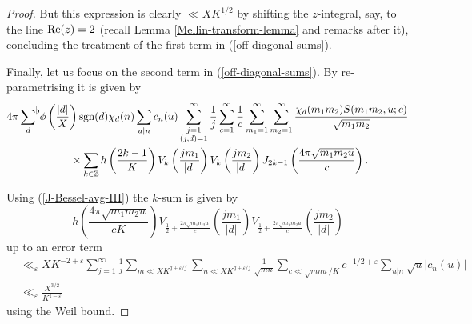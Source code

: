 \documentclass[a4paper,10pt,twoside]{amsart}
\theoremstyle{definition}
\numberwithin{equation}{section}
\newcommand\Z{\mathbb{Z}}
\newcommand\eps{\varepsilon}
\renewcommand{\Re}{\textnormal{Re}}
\renewcommand\:{\colon}
\newcommand{\sumflat}{\mathop{{\sum}^{\raisebox{-3pt}{\makebox[0pt][l]{$\flat$}}}}}
\begin{document}
\begin{proof}

\noindent But this expression is clearly $\ll XK^{1/2}$ by shifting the $z$-integral, say, to the line $\Re(z)=2$ (recall Lemma \ref{Mellin-transform-lemma} and remarks after it), concluding the treatment of the first term in (\ref{off-diagonal-sums}). 

Finally, let us focus on the second term in (\ref{off-diagonal-sums}). By re-parametrising it is given by 
\begin{align*}
&4\pi \sumflat_d\,\phi\left(\frac{|d|}X\right)\text{sgn}(d)\chi_d(n)\sum_{u|n}c_n(u)\sum_{\substack{j=1\\(j,d)=1}}^\infty\frac1j\sum_{c=1}^\infty\frac1c\sum_{m_1=1}^\infty\sum_{m_2=1}^\infty\frac{\chi_d(m_1m_2)S(m_1m_2,u;c)}{\sqrt{m_1m_2}}\\
&\qquad\qquad\qquad\times\sum_{k\in\Z}h\left(\frac{2k-1}K\right)V_k\left(\frac{jm_1}{|d|}\right)V_k\left(\frac{jm_2}{|d|}\right)J_{2k-1}\left(\frac{4\pi\sqrt{m_1m_2u}}{c}\right).
\end{align*}

Using (\ref{J-Bessel-avg-III}) the $k$-sum is given by
\[
h\left(\frac{4\pi\sqrt{m_1m_2u}}{cK}\right)V_{\frac12+\frac{2\pi\sqrt{m_1m_2u}}{c}}\left(\frac{jm_1}{|d|}\right)V_{\frac12+\frac{2\pi\sqrt{m_1m_2u}}{c}}\left(\frac{jm_2}{|d|}\right)
\]
up to an error term 
\begin{align*}
&\ll_\eps XK^{-2+\eps}\sum_{j=1}^\infty\frac1j\sum_{m\ll XK^{q+\eps/j}}\sum_{n\ll XK^{q+\eps/j}}\frac1{\sqrt{mn}}\sum_{c\ll \sqrt{mnu}/K}c^{-1/2+\eps}\sum_{u|n}\sqrt u|c_n(u)|\\
&\ll_\eps \frac{X^{3/2}}{K^{1-\eps}}
\end{align*}
using the Weil bound. 


\end{proof}
\end{document}
